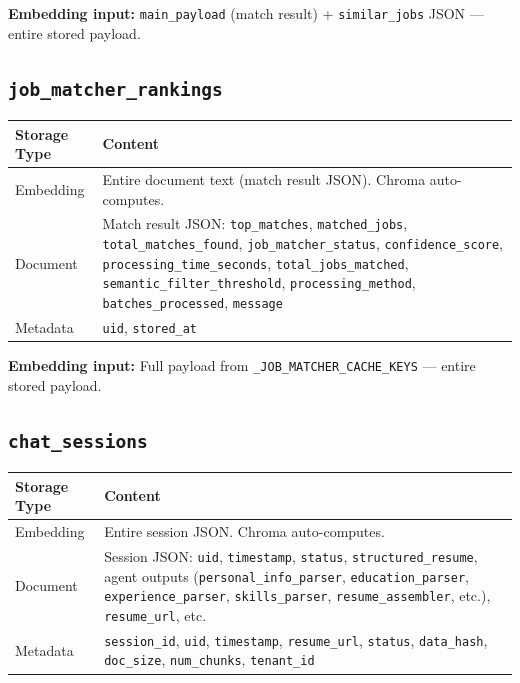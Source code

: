 \documentclass[11pt]{article}
\begin{document}
\textbf{Embedding input:} \texttt{main\_payload} (match result) + \texttt{similar\_jobs} JSON --- entire stored payload.

\subsection{\texttt{job\_matcher\_rankings}}

\begin{table}[h]
\centering
\begin{tabular}{@{}p{2.2cm}p{11cm}@{}}
\toprule
\textbf{Storage Type} & \textbf{Content} \\
\midrule
Embedding & Entire document text (match result JSON). Chroma auto-computes. \\
\midrule
Document & Match result JSON: \texttt{top\_matches}, \texttt{matched\_jobs}, \texttt{total\_matches\_found}, \texttt{job\_matcher\_status}, \texttt{confidence\_score}, \texttt{processing\_time\_seconds}, \texttt{total\_jobs\_matched}, \texttt{semantic\_filter\_threshold}, \texttt{processing\_method}, \texttt{batches\_processed}, \texttt{message} \\
\midrule
Metadata & \texttt{uid}, \texttt{stored\_at} \\
\bottomrule
\end{tabular}
\end{table}

\textbf{Embedding input:} Full payload from \texttt{\_JOB\_MATCHER\_CACHE\_KEYS} --- entire stored payload.

\subsection{\texttt{chat\_sessions}}

\begin{table}[h]
\centering
\begin{tabular}{@{}p{2.2cm}p{11cm}@{}}
\toprule
\textbf{Storage Type} & \textbf{Content} \\
\midrule
Embedding & Entire session JSON. Chroma auto-computes. \\
\midrule
Document & Session JSON: \texttt{uid}, \texttt{timestamp}, \texttt{status}, \texttt{structured\_resume}, agent outputs (\texttt{personal\_info\_parser}, \texttt{education\_parser}, \texttt{experience\_parser}, \texttt{skills\_parser}, \texttt{resume\_assembler}, etc.), \texttt{resume\_url}, etc. \\
\midrule
Metadata & \texttt{session\_id}, \texttt{uid}, \texttt{timestamp}, \texttt{resume\_url}, \texttt{status}, \texttt{data\_hash}, \texttt{doc\_size}, \texttt{num\_chunks}, \texttt{tenant\_id} \\
\bottomrule
\end{tabular}
\end{table}
\end{document}
